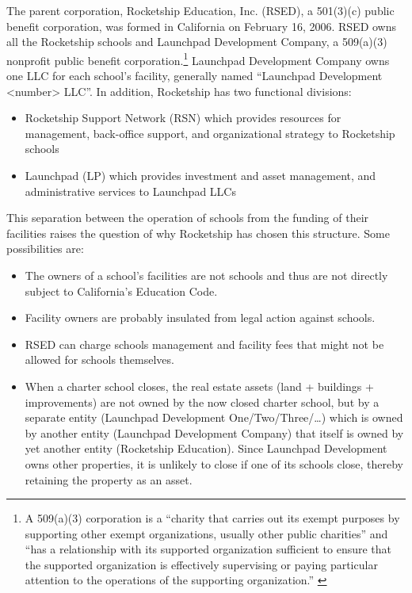 The parent corporation, Rocketship Education, Inc. (RSED), a 501(3)(c) public benefit corporation, was formed in California on February 16, 2006. RSED owns all the Rocketship schools and Launchpad Development Company, a 509(a)(3) nonprofit public benefit corporation.\footnote{A 509(a)(3) corporation is a ``charity that carries out its exempt purposes by supporting other exempt organizations, usually other public charities'' and ``has a relationship with its supported organization sufficient to ensure that the supported organization is effectively supervising or paying particular attention to the operations of the supporting organization.'' \parencite[accessed 29 Sep 2023]{IRS2023}}  Launchpad Development Company owns one LLC for each school's facility, generally named ``Launchpad Development <number> LLC''. In addition, Rocketship has two functional divisions:
\begin{itemize}
  \item Rocketship Support Network (RSN) which provides resources for management, back-office support, and organizational strategy to Rocketship schools
  \item Launchpad (LP) which provides investment and asset management, and administrative services to Launchpad LLCs
\end{itemize}

This separation between the operation of schools from the funding of their facilities raises the question of why Rocketship has chosen this structure. Some possibilities are:
\begin{itemize}
  \item The owners of a school's facilities are not schools and thus are not directly subject to California's Education Code.
  \item Facility owners are probably insulated from legal action against schools.
  \item RSED can charge schools management and facility fees that might not be allowed for schools themselves.
  \item When a charter school closes, the real estate assets (land + buildings + improvements) are not owned by the now closed charter school, but by a separate entity (Launchpad Development One/Two/Three/\ldots) which is owned by another entity (Launchpad Development Company) that itself is owned by yet another entity (Rocketship Education). Since Launchpad Development owns other properties, it is unlikely to close if one of its schools close, thereby retaining the property as an asset.
\end{itemize}

